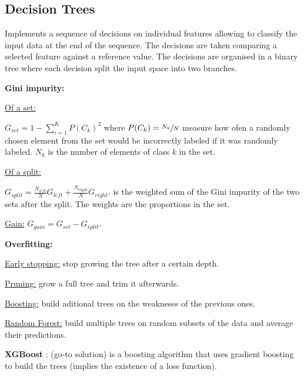 \subsection*{Decision Trees}
Implements a sequence of decisions
on individual features allowing to classify the input data
at the end of the sequence. The decisions are taken
comparing a selected feature against a reference value.
The decisions are organised in a binary tree where each
decision split the input space into two branches.

\textbf{Gini impurity:}

\underline{Of a set:}

$G_{set} = 1 - \sum_{i=1}^{K} P(C_k)^2$ where
$P(C_k)=\sfrac{N_k}{N}$ measure how ofen a randomly chosen element
from the set would be incorrectly labeled if it was randomly labeled.
$N_k$ is the number of elements of class $k$ in the set.

\underline{Of a split:}

$G_{split} = \frac{N_{left}}{N}G_{left} + \frac{N_{right}}{N}G_{right}$.
is the weighted sum of the Gini impurity of the two sets after the split.
The weights are the proportions in the set.

\underline{Gain:} $G_{gain} = G_{set} - G_{split}$.

\textbf{Overfitting:}

\underline{Early stopping:} stop growing the tree after a certain depth.

\underline{Pruning:} grow a full tree and trim it afterwards.

\underline{Boosting:} build aditional trees on the weakneses of the previous ones.

\underline{Random Forest:} build multiple trees on random subsets of the data and average
their predictions.

\textbf{XGBoost} : (go-to solution) is a boosting algorithm that uses gradient boosting
to build the trees (implies the existence of a loss function).
